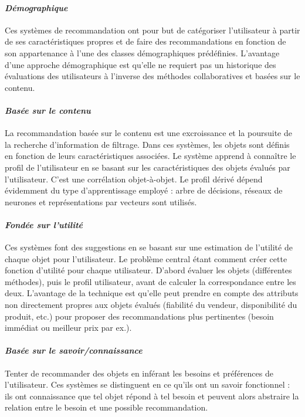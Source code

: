 		\paragraph{\emph{Démographique} \\ \quad}
Ces systèmes de recommandation ont pour but de catégoriser l’utilisateur à partir de ses caractéristiques propres et de faire des recommandations en fonction de son appartenance à l’une des classes démographiques prédéfinies. L’avantage d’une approche démographique est qu’elle ne requiert pas un historique des évaluations des utilisateurs à l’inverse des méthodes collaboratives et basées sur le contenu.

		\paragraph{\emph{Basée sur le contenu} \\ \quad}
 La recommandation basée sur le contenu est une excroissance et la poursuite de la recherche d'information de filtrage. Dans ces systèmes, les objets sont définis en fonction de leurs caractéristiques associées. Le système apprend à connaître le profil de l’utilisateur en se basant sur les caractéristiques des objets évalués par l’utilisateur. C’est une corrélation objet-à-objet. Le profil dérivé dépend évidemment du type d’apprentissage employé : arbre de décisions, réseaux de neurones et représentations par vecteurs sont utilisés.

		\paragraph{\emph{Fondée sur l’utilité} \\ \quad}
Ces systèmes font des suggestions en se basant sur une estimation de l’utilité de chaque objet pour l’utilisateur. Le problème central étant comment créer cette fonction d’utilité pour chaque utilisateur. D’abord évaluer les objets (différentes méthodes), puis le profil utilisateur, avant de calculer la correspondance entre les deux. L’avantage de la technique est qu’elle peut prendre en compte des attributs non directement propres aux objets évalués (fiabilité du vendeur, disponibilité du produit, etc.) pour proposer des recommandations plus pertinentes (besoin immédiat ou meilleur prix par ex.).

		\paragraph{\emph{Basée sur le savoir/connaissance} \\ \quad}
Tenter de recommander des objets en inférant les besoins et préférences de l’utilisateur. Ces systèmes se distinguent en ce qu’ils ont un savoir fonctionnel : ils ont connaissance que tel objet répond à tel besoin et peuvent alors abstraire la relation entre le besoin et une possible recommandation.

